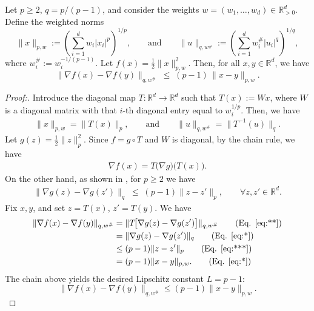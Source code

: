 \documentclass[letterpaper, 10 pt]{article}
\begin{document}
\begin{lemma}\label{lem:smoothness_of_p_norm}
Let \(p\ge 2\), \(q=p/(p-1)\), and consider the weights \(w=(w_1,\dots,w_d)\in\mathbb{R}_{>0}^d\).
Define the weighted norms
\[  \|x\|_{p,w}:=\left(\sum_{i=1}^d w_i|x_i|^{p}\right)^{1/p}, \qquad \text{and} \qquad 
  \|u\|_{q,w^{\#}}:=\left(\sum_{i=1}^d w_i^{\#}|u_i|^{q}\right)^{1/q},
\]
where $w_i^{\#}:=w_i^{-1/(p-1)}$. Let \(f(x)=\tfrac12\|x\|_{p,w}^{2}\). Then, for all \(x,y\in\mathbb{R}^d\), we have
\[
  \|\nabla f(x)-\nabla f(y)\|_{q,w^{\#}}
  \;\le\;(p-1)\,\|x-y\|_{p,w}.
\]
\end{lemma}
\begin{proof}[Proof:] 
Introduce the diagonal map $T:\mathbb{R}^d \to \mathbb{R}^d$ such that $T(x):=W x$, 
where $W$ is a diagonal matrix with that $i$-th diagonal entry equal to $w^{1/p}_i$. Then, we have
\begin{align}\label{eq:*}    
  \|x\|_{p,w}=\|T(x)\|_{p}, \qquad \text{and} \qquad  \|u\|_{q,w^{\#}}=\|T^{-1}(u)\|_{q}.
\end{align} 
Let \(g(z)= \tfrac12\|z\|_{p}^{2}\). Since \(f=g\circ T\) and \(W\) is diagonal, by the chain rule, we have
\begin{align}\label{eq:**}
  \nabla f(x)=T\bigl(\nabla g\bigr)\!\bigl(T(x)\bigr).
\end{align} 
On the other hand, as shown in \cite[Example 5.11]{beck2017first}, for \(p\ge 2\) we have
\begin{align}\label{eq:***}
  \|\nabla g(z)-\nabla g(z')\|_{q}
    \;\le\;(p-1)\|z-z'\|_{p},\qquad\forall z,z'\in\mathbb{R}^d.
\end{align}
Fix \(x,y\), and set \(z=T(x)\), \(z'=T(y)\). We have
\begin{align}
  \|\nabla f(x)-\nabla f(y)\|_{q,w^{\#}}
    &=\|T\!\bigl[\nabla g(z)-\nabla g(z')\bigr]\|_{q,w^{\#}}\tag{Eq. \eqref{eq:**}}\\
    &=\|\nabla g(z)-\nabla g(z')\|_{q}
       \tag{Eq. \eqref{eq:*}}\\
    &\le(p-1)\|z-z'\|_{p}
       \tag{Eq. \eqref{eq:***}}\\
    &=(p-1)\|x-y\|_{p,w}.
       \tag{Eq. \eqref{eq:*}}
\end{align} 
The chain above yields the desired Lipschitz constant \(L=p-1\):
\[  \|\nabla f(x)-\nabla f(y)\|_{q,w^{\#}} \leq (p-1)\|x-y\|_{p,w}. \]
\end{proof}
\end{document}
